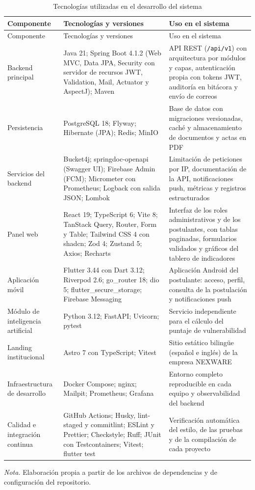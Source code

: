 \begin{longtable}{>{\raggedright\arraybackslash}p{2.9cm} >{\raggedright\arraybackslash}p{5.6cm} >{\raggedright\arraybackslash}p{4.5cm}}
\caption{Tecnologías utilizadas en el desarrollo del sistema}\label{tab:tecnologias_reales}\\
\toprule
Componente & Tecnologías y versiones & Uso en el sistema \\
\midrule
\endfirsthead
\toprule
Componente & Tecnologías y versiones & Uso en el sistema \\
\midrule
\endhead
\bottomrule
\endfoot
Backend principal & Java 21; Spring Boot 4.1.2 (Web MVC, Data JPA, Security con servidor de recursos JWT, Validation, Mail, Actuator y AspectJ); Maven & API REST (\texttt{/api/v1}) con arquitectura por módulos y capas, autenticación propia con tokens JWT, auditoría en bitácora y envío de correos \\
Persistencia & PostgreSQL 18; Flyway; Hibernate (JPA); Redis; MinIO & Base de datos con migraciones versionadas, caché y almacenamiento de documentos y actas en PDF \\
Servicios del backend & Bucket4j; springdoc-openapi (Swagger UI); Firebase Admin (FCM); Micrometer con Prometheus; Logback con salida JSON; Lombok & Limitación de peticiones por IP, documentación de la API, notificaciones push, métricas y registros estructurados \\
Panel web & React 19; TypeScript 6; Vite 8; TanStack Query, Router, Form y Table; Tailwind CSS 4 con shadcn; Zod 4; Zustand 5; Axios; Recharts & Interfaz de los roles administrativos y de los postulantes, con tablas paginadas, formularios validados y gráficos del tablero de indicadores \\
Aplicación móvil & Flutter 3.44 con Dart 3.12; Riverpod 2.6; go\_router 18; dio 5; flutter\_secure\_storage; Firebase Messaging & Aplicación Android del postulante: acceso, perfil, consulta de la postulación y notificaciones push \\
Módulo de inteligencia artificial & Python 3.12; FastAPI; Uvicorn; pytest & Servicio independiente para el cálculo del puntaje de vulnerabilidad \\
Landing institucional & Astro 7 con TypeScript; Vitest & Sitio estático bilingüe (español e inglés) de la empresa NEXWARE \\
Infraestructura de desarrollo & Docker Compose; nginx; Mailpit; Prometheus; Grafana & Entorno completo reproducible en cada equipo y observabilidad del backend \\
Calidad e integración continua & GitHub Actions; Husky, lint-staged y commitlint; ESLint y Prettier; Checkstyle; Ruff; JUnit con Testcontainers; Vitest; flutter test & Verificación automática del estilo, de las pruebas y de la compilación de cada proyecto \\
\end{longtable}
\noindent\textit{Nota.} Elaboración propia a partir de los archivos de dependencias y de configuración del repositorio.


